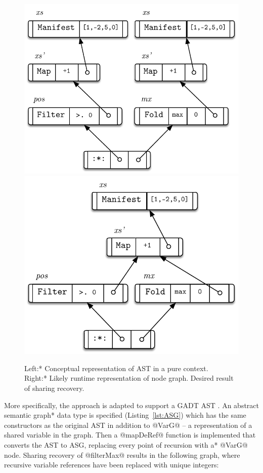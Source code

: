 \documentclass[preamble.tex]{subfiles}
\begin{document}
\begin{figure}
\includegraphics[scale=0.7]{img/AST-Flat-FilterMax-Unshared}%
\includegraphics[scale=0.7]{img/AST-Flat-FilterMax-Shared}
\caption{\*Left:* Conceptual representation of  AST in a pure context.\\\*Right:* Likely runtime representation of  node graph. Desired result of sharing recovery.}
\label{fig:Flat-FilterMax-Sharing}
\end{figure}

More specifically, the approach is adapted to support a GADT AST \cite{GADTSharing}. An \*abstract semantic graph* data type is specified (Listing~\ref{lst:ASG}) which has the same constructors as the original AST in addition to @VarG@ -- a representation of a shared variable in the graph. Then a @mapDeRef@ function is implemented that converts the AST to ASG, \*replacing every point of recursion with a* @VarG@ node. Sharing recovery of @filterMax@ results in the following graph, where recursive variable references have been replaced with unique integers:
\end{document}
